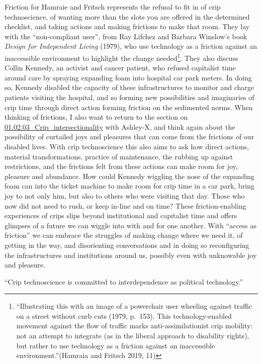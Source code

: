 Friction for Hamraie and Fritsch represents the refusal to fit in of
crip technoscience, of wanting more than the slots you are offered in
the determined checklist, and taking actions and making frictions to
make that room. They lay with the ``non-compliant user'', from Ray
Lifchez and Barbara Winslow's book \emph{Design for Independent Living}
(1979), who use technology as a friction against an inaccessible
environment to highlight the change needed\footnote{``Illustrating this
  with an image of a powerchair user wheeling against traffic on a
  street without curb cuts (1979, p.~153). This technology-enabled
  movement against the flow of traffic marks anti-assimilationist crip
  mobility: not an attempt to integrate (as in the liberal approach to
  disability rights), but rather to use technology as a friction against
  an inaccessible environment.''(Hamraia and Fritsch 2019, 11)}. They
also discuss Collin Kennedy, an activist and cancer patient, who refused
capitalist time around care by spraying expanding foam into hospital car
park meters. In doing so, Kennedy disabled the capacity of these
infrastructures to monitor and charge patients visiting the hospital,
and so forming new possibilities and imaginaries of crip time through
direct action forming friction on the sedimented norms. When thinking of
frictions, I also want to return to the section on
\href{01.02.03_Crip_intersectionality.md}{01.02.03\_Crip\_intersectionality}
with Ashley-X, and think again about the possibility of curtailed joys
and pleasures that can come from the frictions of our disabled lives.
With crip technoscience this also aims to ask how direct actions,
material transformations, practice of maintenance, the rubbing up
against restrictions, and the frictions felt from these actions can make
room for joy, pleasure and abundance. How could Kennedy wiggling the
nose of the expanding foam can into the ticket machine to make room for
crip time in a car park, bring joy to not only him, but also to others
who were visiting that day. Those who now did not need to rush, or keep
in-line and on time? These friction-enabling experiences of crips slips
beyond institutional and capitalist time and offers glimpses of a future
we can wiggle into with and for one another. With ``access as friction''
we can embrace the struggles of making change where we need it, of
getting in the way, and disorienting conversations and in doing so
reconfiguring the infrastructures and institutions around us, possibly
even with unknowable joy and pleasure.

``Crip technoscience is committed to interdependence as political
technology.''

